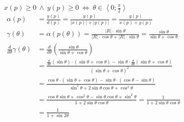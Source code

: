 \item $x\left(p\right) \geqslant 0 \ \wedge \  y\left(p\right) \geqslant 0 \ \Leftrightarrow \ \theta \in \left\langle 0;\frac{\pi}{2}\right\rangle$\\ \alignspace
  		\begin{align*}
        	\alpha\left( p\right) & = \frac{
        		y\left(p\right)
        	}{
        		d\left(p\right)
        	} = \frac{
        		y\left(p\right)
        	}{
        		\left|x\left(p\right)\right| + \left|y\left(p\right)\right|
        	} = \frac{
        		y\left(p\right)
        	}{
        		x\left(p\right) + y\left(p\right)
        	} & \hspace{10cm}\\
        	\gamma\left( \theta\right) & = \alpha\left( p\left(\theta\right) \right) = \frac{
        		\left|R\right| \cdot \sin \theta
        	}{
        		\left|R\right| \cdot \cos \theta + \left|R\right| \cdot \sin \theta
        	} =\frac{
        		\sin \theta
        	}{
        		\sin \theta + \cos \theta
        	} \\
        	\frac{
        		d
        	}{
        		d\theta
        	}\gamma\left( \theta\right) & = \frac{
        		d
        	}{
        		d\theta
        	}\left(
        		\frac{ 
        			\sin \theta
        		}{
        			\sin \theta + \cos \theta
        		}
        	\right) \\ 
        	& =\frac{
        		\frac{
        			d
        		}{
        			d\theta
        		}\left(
        			\sin\theta
        		\right)\cdot\left(
        			\sin \theta + \cos \theta
        		\right)
        		-\sin\theta\cdot\frac{
        			d
        		}{
        			d\theta
        		}\left(\sin \theta + \cos \theta\right)
        	}{
        		\left(
        			\sin \theta + \cos \theta
        		\right)^2
        	}\\
        	& =\frac{
        		\cos\theta\cdot\left(\sin \theta + \cos \theta\right)
        		-\sin\theta\cdot\left(\cos \theta - \sin \theta\right)
        	}{
        		\sin^2 \theta + 2\sin\theta\cos\theta + \cos^2 \theta 
        	}\\
        	& =\frac{
        		\cos\theta\sin \theta + \cos^2 \theta
        		-\sin\theta\cos \theta  + \sin^2 \theta
        	}{
        		1 + 2\sin\theta\cos\theta
        	} = \frac{
        		1
        	}{
        		1 + 2\sin\theta\cos\theta
        	} \\
        	& = \frac{
        		1
        	}{
        		1 + \sin 2\theta
        	} 
        \end{align*}\alignspace
